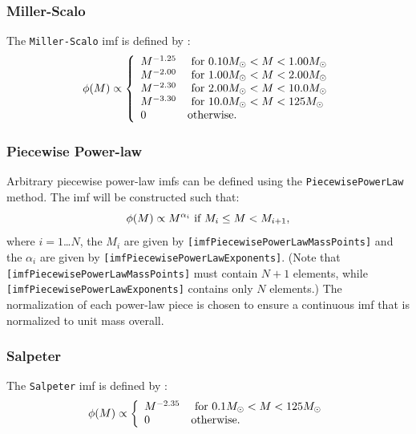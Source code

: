 \subsubsection{Miller-Scalo}

The {\tt Miller-Scalo} \gls{imf} is defined by \citep{miller_initial_1979}:
\begin{equation}
 \phi(M) \propto \left\{ \begin{array}{ll}
 M^{-1.25} & \hbox{ for } 0.10M_\odot < M < 1.00M_\odot \\
 M^{-2.00} & \hbox{ for } 1.00M_\odot < M < 2.00M_\odot \\
 M^{-2.30} & \hbox{ for } 2.00M_\odot < M < 10.0M_\odot \\
 M^{-3.30} & \hbox{ for } 10.0M_\odot < M < 125M_\odot \\
 0 & \hbox {otherwise.} \end{array} \right.
\end{equation}

\subsubsection{Piecewise Power-law}

Arbitrary piecewise power-law {\gls{imf}}s can be defined using the {\tt PiecewisePowerLaw} method. The \gls{imf} will be constructed such that:
\begin{equation}
 \phi(M) \propto M^{\alpha_i} \hbox{ if } M_i \le M < M_{i+1},
\end{equation}
where $i=1$\ldots$N$, the $M_i$ are given by {\tt [imfPiecewisePowerLawMassPoints]} and the $\alpha_i$ are given by {\tt [imfPiecewisePowerLawExponents]}. (Note that {\tt [imfPiecewisePowerLawMassPoints]} must contain $N+1$ elements, while {\tt [imfPiecewisePowerLawExponents]} contains only $N$ elements.) The normalization of each power-law piece is chosen to ensure a continuous \gls{imf} that is normalized to unit mass overall.

\subsubsection{Salpeter}

The {\tt Salpeter} \gls{imf} is defined by \citep{salpeter_luminosity_1955}:
\begin{equation}
 \phi(M) \propto \left\{ \begin{array}{ll} M^{-2.35} & \hbox{ for } 0.1M_\odot < M < 125M_\odot \\ 0 & \hbox {otherwise.} \end{array} \right.
\end{equation}

